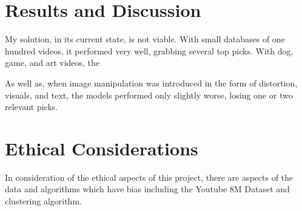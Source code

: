 \documentclass[10pt,twocolumn]{article}
\begin{document}
\section{Results and Discussion}

My solution, in its current state, is not viable. With small databases of one hundred videos, it performed very well, grabbing several top picks. With dog, game, and art videos, the 

As well as, when image manipulation was introduced in the form of distortion, visuals, and text, the models performed only slightly worse, losing one or two relevant picks. 


\section {Ethical Considerations}



In consideration of the ethical aspects of this project, there are aspects of the data and algorithms which have bias including the Youtube 8M Dataset and clustering algorithm.

\end{document}
